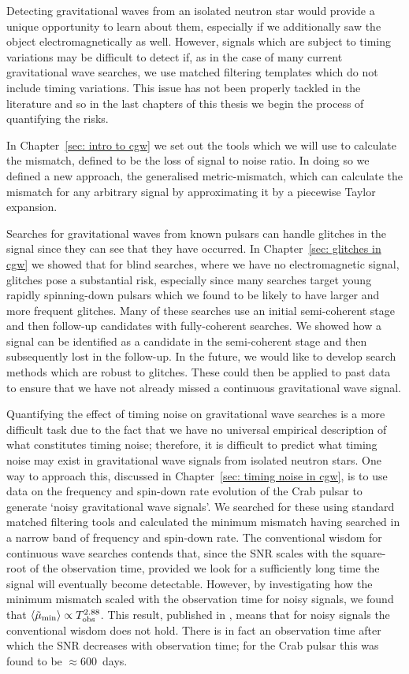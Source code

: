 \documentclass[twoside, 11pt]{thesis}
\begin{document}
Detecting gravitational waves from an isolated neutron star would provide a
unique opportunity to learn about them, especially if we additionally saw the
object electromagnetically as well. However, signals which are subject to
timing variations may be difficult to detect if, as in the case of many current
gravitational wave searches, we use matched filtering templates which do not
include timing variations. This issue has not been properly tackled in the
literature and so in the last chapters of this thesis we begin the process of
quantifying the risks.

In Chapter~\ref{sec: intro to cgw} we set out the tools which we will use to
calculate the mismatch, defined to be the loss of signal to noise ratio. In
doing so we defined a new approach, the generalised metric-mismatch, which can
calculate the mismatch for any arbitrary signal by approximating it by a
piecewise Taylor expansion.

Searches for gravitational waves from known pulsars can handle glitches in the
signal since they can see that they have occurred. In Chapter~\ref{sec:
glitches in cgw} we showed that for blind searches, where we have no
electromagnetic signal, glitches pose a substantial risk, especially since many
searches target young rapidly spinning-down pulsars which we found to be
likely to have larger and more frequent glitches. Many of these searches use
an initial semi-coherent stage and then follow-up candidates with
fully-coherent searches.  We showed how a signal can be identified as a
candidate in the semi-coherent stage and then subsequently lost in the
follow-up. In the future, we would like to develop search methods which are
robust to glitches. These could then be applied to past data to ensure that we
have not already missed a continuous gravitational wave signal.

Quantifying the effect of timing noise on gravitational wave searches is a more
difficult task due to the fact that we have no universal empirical description
of what constitutes timing noise; therefore, it is difficult to predict what
timing noise may exist in gravitational wave signals from isolated neutron
stars.  One way to approach this, discussed in Chapter~\ref{sec: timing noise
in cgw}, is to use data on the frequency and spin-down rate evolution of the
Crab pulsar to generate `noisy gravitational wave signals'.  We searched for
these using standard matched filtering tools and calculated the minimum
mismatch having searched in a narrow band of frequency and spin-down rate. The
conventional wisdom for continuous wave searches contends that, since the SNR
scales with the square-root of the observation time, provided we look for a
sufficiently long time the signal will eventually become detectable.  However,
by investigating how the minimum mismatch scaled with the observation time for
noisy signals, we found that $\langle \tilde{\mu}_{\textrm{min}} \rangle \propto
T_{\mathrm{obs}}^{2.88}$.  This result, published in \citet{Ashton2015}, means that for
noisy signals the conventional wisdom does not hold. There is in fact an
observation time after which the SNR decreases with observation time; for the
Crab pulsar this was found to be $ \approx 600$~days.
\end{document}
